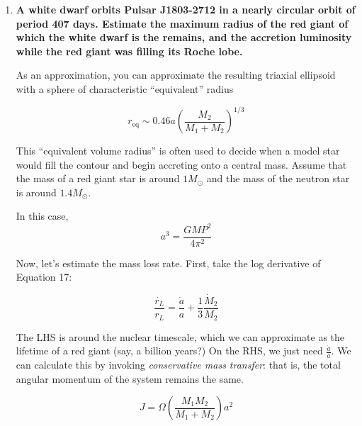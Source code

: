 \documentclass[a4paper]{article}
\begin{document}
\begin{enumerate}
(probably garbage)
In case of a WD, Newtonian gravity is a good approximation and the only limit is that the separation $a > R_{\rm WD}+R_{\rm Earth} $. Since $R_{\rm WD}\approx R_{\rm Earth}$, $a_{\rm min} \approx 12 \ 200 \ \rm km$ and 

$$ P_{\rm min} = \sqrt{\dfrac{4 \pi^2}{G M_{\rm WD}} (2 R_{\rm WD})^3 } = 22.7 \ \rm s $$

The thing is, for both a NS and a WD, the ISCO is right at the surface... 

$$ r_\mathrm{ISCO} = \frac{6 GM}{c^2} = 6 (1.5\,\mathrm{km}) \left( \frac{M}{M_\odot} \right) $$

For a NS, the innermost stable circular orbit (ISCO) is outside of the surface. However, not by much ($\sim 1 \ \rm km$ above the surface). 

\item \textbf{A white dwarf orbits Pulsar J1803-2712 in a nearly circular orbit of period 407 days. Estimate
the maximum radius of the red giant of which the white dwarf is the remains, and the accretion
luminosity while the red giant was filling its Roche lobe.}

As an approximation, you can approximate the resulting triaxial ellipsoid with a sphere of characteristic ``equivalent'' radius

\begin{equation}
r_\mathrm{eq} \sim 0.46 a \left( \frac{M_2}{M_1 + M_2} \right)^{1/3}
\end{equation}

This ``equivalent volume radius'' is often used to decide when a model star would fill the contour and begin accreting onto a central mass. Assume that the mass of a red giant star is around $1 M_\odot$ and the mass of the neutron star is around $1.4 M_\odot$. 

In this case, $$ a^3 = \frac{GMP^2}{4 \pi^2} $$

Now, let's estimate the mass loss rate. First, take the log derivative of Equation 17:

$$ \frac{\dot{r_L}}{r_L} = \frac{\dot{a}}{a} + \frac{1}{3} \frac{\dot{M}_2}{M_2} $$

The LHS is around the nuclear timescale, which we can approximate as the lifetime of a red giant (say, a billion years?) On the RHS, we just need $\frac{\dot{a}}{a}$. We can calculate this by invoking \emph{conservative mass transfer}: that is, the total angular momentum of the system remains the same. 

\begin{equation}
J = \Omega \left( \frac{M_1 M_2}{M_1 + M_2} \right) a^2 
\end{equation}


\end{enumerate}
\end{document}
